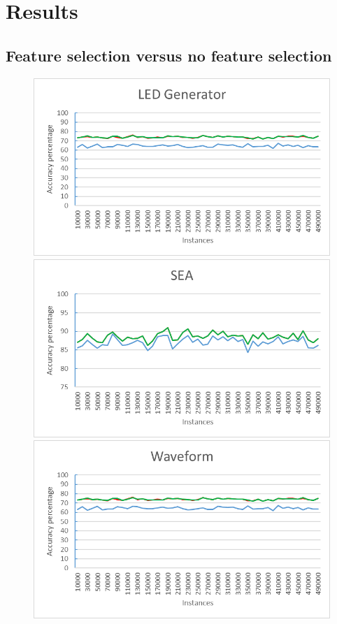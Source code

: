 \chapter{Results}
\label{chapter:Results}

\section{Feature selection versus no feature selection}
\begin{figure}[h]
\begin{center}
\includegraphics[scale=0.25]{Graphs/LED/10_graph}
\includegraphics[scale=0.25]{Graphs/SEA/graph}
\includegraphics[scale=0.25]{Graphs/Waveform/graph}

\end{center}
\end{figure}
